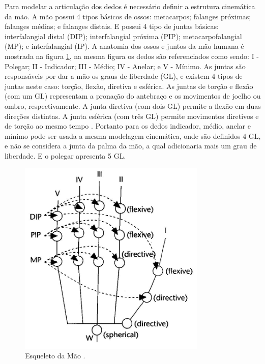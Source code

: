 Para modelar a articulação dos dedos é necessário definir a estrutura cinemática da mão. A mão possui 4 tipos básicos de ossos: metacarpos; falanges próximas; falanges médias; e falanges distais. E possui 4 tipo de juntas básicas: interfalangial distal (DIP); interfalangial próxima (PIP); metacarpofalangial (MP); e interfalangial (IP). A anatomia dos ossos e juntos da mão humana é mostrada na figura \ref{Lee_Kunis_Mao}, na mesma figura os dedos são referenciados como sendo: I - Polegar; II - Indicador; III - Médio; IV - Anelar; e V - Mínimo. As juntas são responsáveis por dar a mão os graus de liberdade (GL), e existem 4 tipos de juntas neste caso: torção, flexão, diretiva e esférica. As juntas de torção e flexão (com um GL) representam a pronação do antebraço e os movimentos de joelho ou ombro, respectivamente. A junta diretiva (com dois GL) permite a flexão em duas direções distintas. A junta esférica (com três GL) permite movimentos diretivos e de torção ao mesmo tempo \cite{lee1995model}. Portanto para os dedos indicador, médio, anelar e mínimo pode ser usada a mesma modelagem cinemática, onde são definidos 4 GL, e não se considera a junta da palma da mão, a qual adicionaria mais um grau de liberdade. E o polegar apresenta 5 GL\cite{lee1995model}.

\begin{figure}[H]
\centering
\includegraphics[width = 0.8\textwidth]{img/Lee_Kunis_Mao.JPG}
\caption[O esqueleto da mão observado pelo lado da palma]{Esqueleto da Mão \cite{lee1995model}.}
\label{Lee_Kunis_Mao}
\end{figure}

